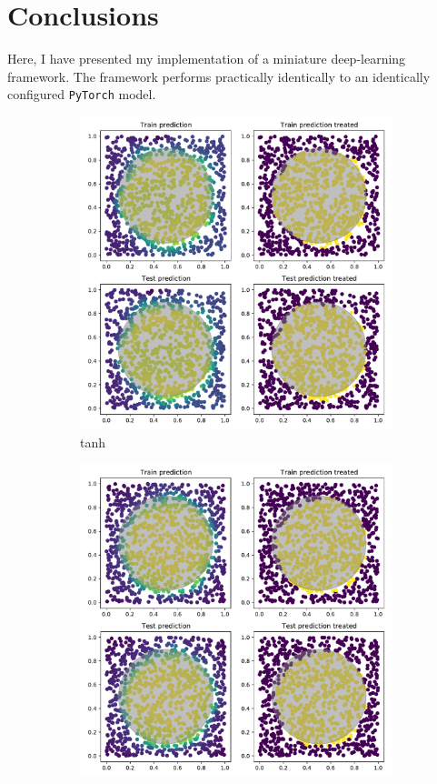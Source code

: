 \documentclass[prl, article, twocolumn]{revtex4-1}
\begin{document}
\section{Conclusions}
Here, I have presented my implementation of a miniature deep-learning framework. The framework performs practically identically to an identically configured \texttt{PyTorch} model.

\begin{figure}[hb!]
    \begin{subfigure}[]{0.45\linewidth}
        \includegraphics[width=\textwidth]{figures/tanh_points.pdf}
        \caption{tanh}
    \end{subfigure}
    \begin{subfigure}[]{0.45\linewidth}
        \includegraphics[width=\textwidth]{figures/relu_points.pdf}

\end{subfigure}
\end{figure}
\end{document}
